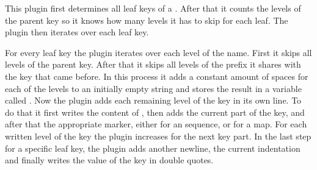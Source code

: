 This plugin first determines all leaf keys of a . After that it counts the levels of the parent key so it knows how many levels it has to skip for each leaf. The plugin then iterates over each leaf key.

For every leaf key the plugin iterates over each level of the name. First it skips all levels of the parent key. After that it skips all levels of the prefix it shares with the key that came before. In this process it adds a constant amount of spaces for each of the levels to an initially empty string and stores the result in a variable called . Now the plugin adds each remaining level of the key in its own line. To do that it first writes the content of , then adds the current part of the key, and after that the appropriate marker, either \yaml{-} for an sequence, or \yaml{:} for a map. For each written level of the key the plugin increases  for the next key part. In the last step for a specific leaf key, the plugin adds another newline, the current indentation and finally writes the value of the key in double quotes.
